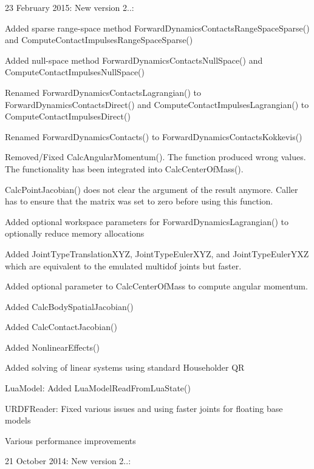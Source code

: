 \begin{DoxyItemize}
\item 23 February 2015\+: New version 2..\+:
\begin{DoxyItemize}
\item Added sparse range-\/space method Forward\+Dynamics\+Contacts\+Range\+Space\+Sparse() and Compute\+Contact\+Impulses\+Range\+Space\+Sparse()
\item Added null-\/space method Forward\+Dynamics\+Contacts\+Null\+Space() and Compute\+Contact\+Impulses\+Null\+Space()
\item Renamed Forward\+Dynamics\+Contacts\+Lagrangian() to Forward\+Dynamics\+Contacts\+Direct() and Compute\+Contact\+Impulses\+Lagrangian() to Compute\+Contact\+Impulses\+Direct()
\item Renamed Forward\+Dynamics\+Contacts() to Forward\+Dynamics\+Contacts\+Kokkevis()
\item Removed/\+Fixed Calc\+Angular\+Momentum(). The function produced wrong values. The functionality has been integrated into Calc\+Center\+Of\+Mass().
\item Calc\+Point\+Jacobian() does not clear the argument of the result anymore. Caller has to ensure that the matrix was set to zero before using this function.
\item Added optional workspace parameters for Forward\+Dynamics\+Lagrangian() to optionally reduce memory allocations
\item Added Joint\+Type\+Translation\+X\+Y\+Z, Joint\+Type\+Euler\+X\+Y\+Z, and Joint\+Type\+Euler\+Y\+X\+Z which are equivalent to the emulated multidof joints but faster.
\item Added optional parameter to Calc\+Center\+Of\+Mass to compute angular momentum.
\item Added Calc\+Body\+Spatial\+Jacobian()
\item Added Calc\+Contact\+Jacobian()
\item Added Nonlinear\+Effects()
\item Added solving of linear systems using standard Householder Q\+R
\item Lua\+Model\+: Added Lua\+Model\+Read\+From\+Lua\+State()
\item U\+R\+D\+F\+Reader\+: Fixed various issues and using faster joints for floating base models
\item Various performance improvements
\end{DoxyItemize}
\item 21 October 2014\+: New version 2..\+:

\end{DoxyItemize}
